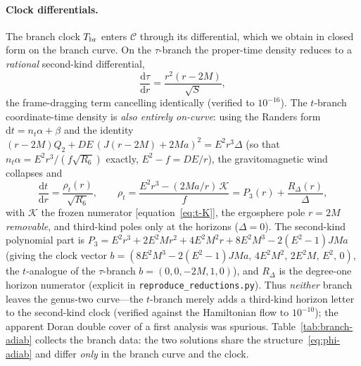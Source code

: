 \documentclass[12pt]{iopart}
\theoremstyle{plain}
\theoremstyle{definition}
\theoremstyle{remark}
\newcommand{\dd}{\mathrm{d}}
\begin{document}
\paragraph{Clock differentials.} The branch clock $T_{\rm br}$ enters $\mathcal{C}$ through its
differential, which we obtain in closed form on the branch curve. On the
$\tau$-branch the proper-time density reduces to a \emph{rational} second-kind
differential,
\begin{equation}
    \frac{\dd\tau}{\dd r}=\frac{r^2(r-2M)}{\sqrt{S}},
    \label{eq:clock-tau}
\end{equation}
the frame-dragging term cancelling identically (verified to $10^{-16}$). The
$t$-branch coordinate-time density is \emph{also entirely on-curve}: using the
Randers form $\dd t=n_t\alpha+\beta$ and the identity
$(r-2M)Q_2+DE\,(J(r-2M)+2Ma)^2=E^2r^3\Delta$ (so that $n_t\alpha=E^2r^3/(f\sqrt{R_6})$
exactly, $E^2-f=DE/r$), the gravitomagnetic wind collapses and
\begin{equation}
    \frac{\dd t}{\dd r}=\frac{\rho_t(r)}{\sqrt{R_6}},\qquad
    \rho_t=\frac{E^2r^3-(2Ma/r)\,\mathcal K}{f}
          =P_3(r)+\frac{R_\Delta(r)}{\Delta},
    \label{eq:clock-t}
\end{equation}
with $\mathcal K$ the frozen numerator [equation~\eqref{eq:t-K}], the ergosphere pole
$r=2M$ \emph{removable}, and third-kind poles only at the horizons ($\Delta=0$). The
second-kind polynomial part is
$P_3=E^2r^3+2E^2Mr^2+4E^2M^2r+8E^2M^3-2(E^2-1)JMa$ (giving the clock vector
$b=(8E^2M^3-2(E^2-1)JMa,\,4E^2M^2,\,2E^2M,\,E^2,\,0)$, the $t$-analogue of the
$\tau$-branch $b=(0,0,-2M,1,0)$), and $R_\Delta$ is the degree-one horizon numerator
(explicit in \texttt{reproduce\_reductions.py}). Thus \emph{neither} branch leaves
the genus-two curve---the $t$-branch merely adds a third-kind horizon letter to the
second-kind clock (verified against the Hamiltonian flow to $10^{-10}$); the apparent
Doran double cover of a first analysis was spurious. Table~\ref{tab:branch-adiab}
collects the branch data: the two solutions share the structure~\eqref{eq:phi-adiab}
and differ \emph{only} in the branch curve and the clock.
\end{document}
